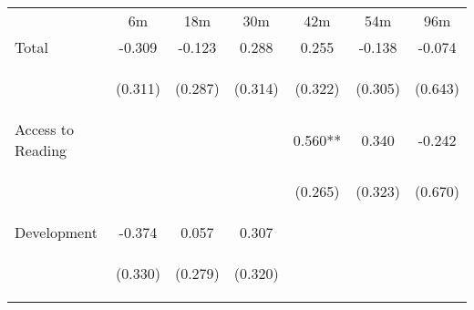 \begin{tabular}{lcccccc}
\hline \noalign{\smallskip} & 6m & 18m & 30m & 42m & 54m & 96m\\
\noalign{\smallskip}\hline \noalign{\smallskip}Total & -0.309 & -0.123 & 0.288 & 0.255 & -0.138 & -0.074\\
 & \begin{footnotesize}(0.311)\end{footnotesize} & \begin{footnotesize}(0.287)\end{footnotesize} & \begin{footnotesize}(0.314)\end{footnotesize} & \begin{footnotesize}(0.322)\end{footnotesize} & \begin{footnotesize}(0.305)\end{footnotesize} & \begin{footnotesize}(0.643)\end{footnotesize}\\
\noalign{\smallskip}Access to Reading &  &  &  & 0.560** & 0.340 & -0.242\\
 & \begin{footnotesize}\end{footnotesize} & \begin{footnotesize}\end{footnotesize} & \begin{footnotesize}\end{footnotesize} & \begin{footnotesize}(0.265)\end{footnotesize} & \begin{footnotesize}(0.323)\end{footnotesize} & \begin{footnotesize}(0.670)\end{footnotesize}\\
\noalign{\smallskip}Development & -0.374 & 0.057 & 0.307 &  &  & \\
 & \begin{footnotesize}(0.330)\end{footnotesize} & \begin{footnotesize}(0.279)\end{footnotesize} & \begin{footnotesize}(0.320)\end{footnotesize} & \begin{footnotesize}\end{footnotesize} & \begin{footnotesize}\end{footnotesize} & \begin{footnotesize}\end{footnotesize}\\

\end{tabular}
